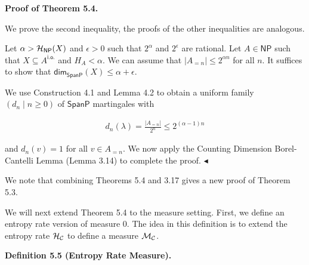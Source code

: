 


\par\medskip\noindent\textbf{Proof of Theorem 5.4.}\par




We prove the second inequality, the proofs of the other inequalities are analogous.\par




Let $\alpha>{\cal H}_{\mathsf{NP}}(X)$ and $\epsilon>0$ such that $2^{\alpha}$ and
$2^{\epsilon}$ are rational. Let $A\in\mathsf{NP}$ such that $X\subseteq A^{\mathsf{i.o.}}$ and $H_{A}<\alpha$. We can assume that $|A_{=n}|\leq 2^{\alpha n}$ for all $n$. It suffices to show that ${\mathsf{dim}}_{\mathsf{SpanP}}(X)\leq\alpha+\epsilon$.\par




We use Construction 4.1 and Lemma 4.2 to obtain a uniform family $(d_{n}\mid n\geq 0)$ of $\mathsf{SpanP}$ martingales with\par


\[\begin{gathered}
d_{n}(\lambda)=\frac{|A_{=n}|}{2^{n}}\leq 2^{(\alpha-1)n}
\end{gathered}\]


and $d_{n}(v)=1$ for all $v\in A_{=n}$. We now apply the Counting Dimension Borel-Cantelli Lemma (Lemma 3.14) to complete the proof.
$\blacktriangleleft$\par




We note that combining Theorems 5.4 and 3.17 gives a new proof of Theorem 5.3.\par




We will next extend Theorem 5.4 to the measure setting. First, we define an entropy rate version of measure 0. The idea in this definition is to extend the entropy rate ${\cal H}_{\cal C}$ to define a measure ${{\cal M}_{{\cal C}}}$.\par





\par\medskip\noindent\textbf{
\textbf{Definition 5.5}\textbf{ }(Entropy Rate Measure)\textbf{.}
}\par



